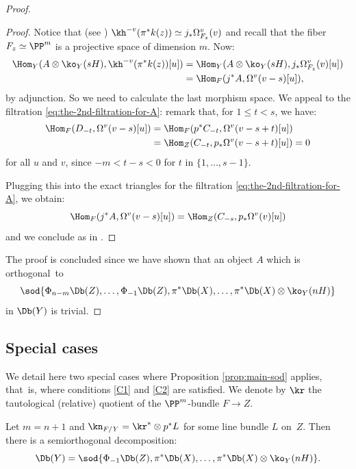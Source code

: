\begin{proof}
\begin{proof}
Notice that (see \eg \cite[Prop.\,11.12]{Huybook}) $\kh^{-v}( \pi^* k(z)) \simeq j_*\Omega_{F_z}^v(v)$ and recall that the fiber
$F_z \simeq \PP^m$ is a projective space of dimension $m$. Now:\vspace*{-3pt}
\begin{align*}
\Hom_Y(A \otimes \ko_Y(sH),\kh^{-v}( \pi^* k(z))[u]) & = \Hom_Y(A \otimes \ko_Y(sH),j_*\Omega_{F_z}^v(v)[u])\\
& = \Hom_F(j^* A, \Omega^v(v-s)[u]),
\end{align*}
by adjunction. So we need to calculate the last morphism space. We appeal to the filtration \eqref{eq:the-2nd-filtration-for-A}:
remark that, for $1 \leq t < s$, we have:\vspace*{-3pt}
\begin{align*}
\Hom_F(D_{-t}, \Omega^v(v-s)[u]) & = \Hom_F(p^* C_{-t}, \Omega^v(v-s+t)[u]) \\
& = \Hom_Z(C_{-t}, p_*\Omega^v(v-s+t)[u])=0
\end{align*}
for all $u$ and $v$, since $-m < t-s < 0$ for $t$ in $\{1,\ldots,s-1\}$.

Plugging this into the exact triangles for the filtration \eqref{eq:the-2nd-filtration-for-A}, we obtain:\vspace*{-3pt}
\[
\Hom_F(j^* A, \Omega^v(v-s)[u])= \Hom_Z(C_{-s},p_*\Omega^v(v)[u])
\]
and we conclude as in \cite[Prop.\,11.18]{Huybook}.
\end{proof}

The proof is concluded since we have shown that an object $A$ which is orthogonal~to\vspace*{-3pt}
\[
\sod{\Phi_{n-m}\Db(Z),\ldots,\Phi_{-1}\Db(Z),\pi^*\Db(X),\ldots,\pi^*\Db(X)\otimes \ko_Y(nH)}
\]
in $\Db(Y)$ is trivial.
\end{proof}

\subsection*{Special cases}

We detail here two special cases where Proposition \ref{prop:main-sod} applies, that~is,
where conditions \eqref{C1} and \eqref{C2} are satisfied. We denote by $\kr$ the tautological (relative)
quotient of the $\PP^m$-bundle $F \to Z$.

\begin{cor}\label{cor:ourcases}
Let $m=n+1$ and $\kn_{F/Y}=\kr^* \otimes p^* L$ for some line bundle $L$ on~$Z$. Then there is a
semiorthogonal decomposition:
\[
\Db(Y)=\sod{\Phi_{-1}\Db(Z),\pi^*\Db(X),\ldots,\pi^*\Db(X)\otimes \ko_Y(nH)}.
\]
\end{cor}

